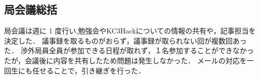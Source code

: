 \subsection*{局会議総括}


局会議は週に 1 度行い,勉強会やKC3Hackについての情報の共有や，記事担当を決定した．
議事録を取るものがおらず，議事録が取られない回が複数回あった．
渉外局員全員が参加できる日程が取れず，１名参加することができなかったが，会議後に内容を共有したため問題は発生しなかった．
メールの対応を一回生にも任せることで，引き継ぎを行った．
